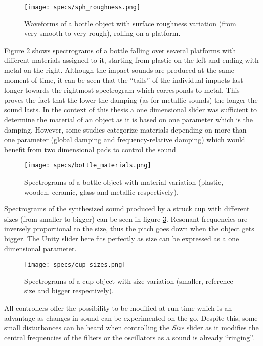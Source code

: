 \begin{figure}[H]
  \centering
    \texttt{[image: specs/sph\_roughness.png]}
      \caption{Waveforms of a bottle object with surface roughness variation (from very smooth to very rough), rolling on a platform.}
      \label{fig:bottle_rough}
\end{figure}

Figure \ref{fig:bottle_materials} shows spectrograms of a bottle falling over several platforms with different materials assigned to it, starting from plastic on the left and ending with metal on the right. Although the impact sounds are produced at the same moment of time, it can be seen that the ``tails'' of the individual impacts last longer towards the rightmost spectrogram which corresponds to metal. This proves the fact that the lower the damping (as for metallic sounds) the longer the sound lasts. In the context of this thesis a one dimensional slider was sufficient to determine the material of an object as it is based on one parameter which is the damping. However, some studies \cite{aramaki2009timbre} categorize materials depending on more than one parameter (global damping and frequency-relative damping) which would benefit from two dimensional pads to control the sound

\begin{figure}[H]
  \centering
    \texttt{[image: specs/bottle\_materials.png]}
      \caption{Spectrograms of a bottle object with material variation (plastic, wooden, ceramic, glass and metallic respectively).}
      \label{fig:bottle_materials}
\end{figure}

Spectrograms of the synthesized sound produced by a struck cup with different sizes (from smaller to bigger) can be seen in figure \ref{fig:cup_sizes}. Resonant frequencies are inversely proportional to the size, thus the pitch goes down when the object gets bigger. The Unity\textsuperscript{\textregistered} slider here fits perfectly as size can be expressed as a one dimensional parameter.

\begin{figure}[H]
  \centering
    \texttt{[image: specs/cup\_sizes.png]}
      \caption{Spectrograms of a cup object with size variation (smaller, reference size and bigger respectively).}
      \label{fig:cup_sizes}
\end{figure}

All controllers offer the possibility to be modified at run-time which is an advantage as changes in sound can be experimented on the go. Despite this, some small disturbances can be heard when controlling the \textit{Size} slider as it modifies the central frequencies of the filters or the oscillators as a sound is already ``ringing''.

